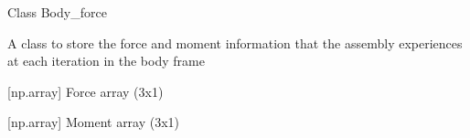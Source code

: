 \documentclass[letterpaper,10pt,english]{sphinxmanual}
\begin{document}
\begin{fulllineitems}
\label{\detokenize{modules:assembly.Body_force}}
\pysigstartsignatures
{}
\pysigstopsignatures
\sphinxAtStartPar
Class Body\_force

\sphinxAtStartPar
A class to store the force and moment information that the assembly experiences at each iteration in the body frame

\begin{fulllineitems}
\label{\detokenize{modules:assembly.Body_force.force}}
\pysigstartsignatures
{}
\pysigstopsignatures
\sphinxAtStartPar
{[}np.array{]} Force array (3x1)

\end{fulllineitems}


\begin{fulllineitems}
\label{\detokenize{modules:assembly.Body_force.moment}}
\pysigstartsignatures
{}
\pysigstopsignatures
\sphinxAtStartPar
{[}np.array{]} Moment array (3x1)

\end{fulllineitems}


\end{fulllineitems}

\end{document}
